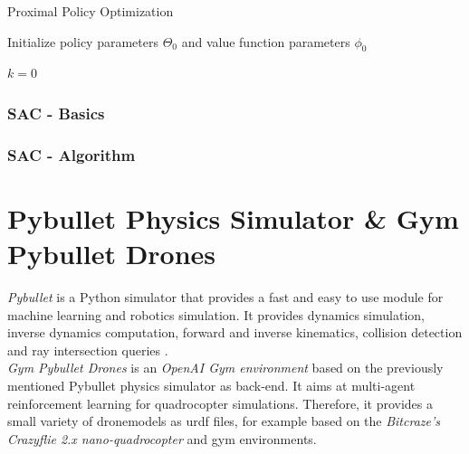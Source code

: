 \begin{algorithm}
	\caption{Proximal Policy Optimization \cite{schulman2017proximal}}
	\label{alg:ppo}

	Initialize policy parameters $\Theta_0$ and value function parameters $\phi_0$
	
	$k = 0$
	
\end{algorithm}

\subsubsection{SAC - Basics}

\newpage

\subsubsection{SAC - Algorithm}

\newpage

\section{Pybullet Physics Simulator \& Gym Pybullet Drones}
\emph{Pybullet}  is a Python simulator that provides a fast and easy to use module for machine learning and robotics simulation. It provides dynamics simulation, inverse dynamics computation, forward and inverse kinematics, collision detection and ray intersection queries \cite{coumans2021}. \\
\emph{Gym Pybullet Drones} \cite{panerati2021learning} is an \emph{OpenAI Gym environment} based on the previously mentioned Pybullet physics simulator as back-end. It aims at multi-agent reinforcement learning for quadrocopter simulations. Therefore, it provides a small variety of dronemodels as urdf files, for example based on the \emph{Bitcraze's Crazyflie 2.x nano-quadrocopter} and gym environments.\\

